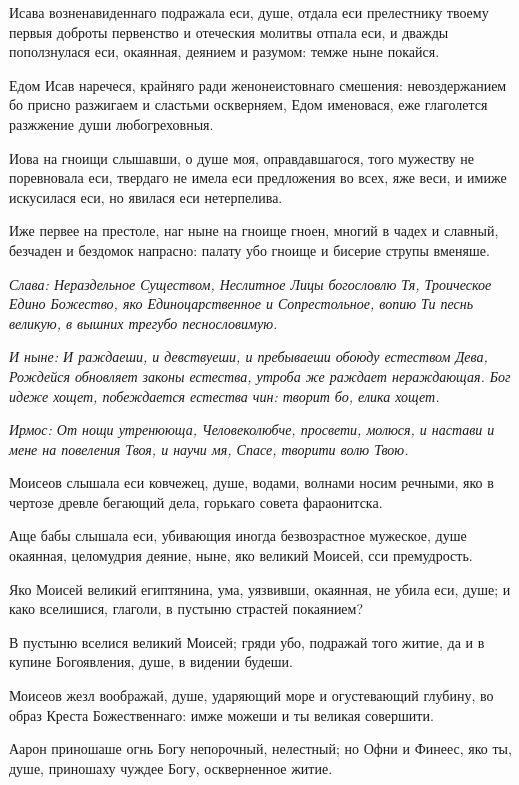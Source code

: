 Исава возненавиденнаго подражала еси, душе, отдала еси прелестнику твоему первыя доброты первенство и отеческия молитвы отпала еси, и дважды поползнулася еси, окаянная, деянием и разумом: темже ныне покайся. 

Едом Исав наречеся, крайняго ради женонеистовнаго смешения: невоздержанием бо присно разжигаем и сластьми оскверняем, Едом именовася, еже глаголется разжжение души любогреховныя. 

Иова на гноищи слышавши, о душе моя, оправдавшагося, того мужеству не поревновала еси, твердаго не имела еси предложения во всех, яже веси, и имиже искусилася еси, но явилася еси нетерпелива. 

Иже первее на престоле, наг ныне на гноище гноен, многий в чадех и славный, безчаден и бездомок напрасно: палату убо гноище и бисерие струпы вменяше. 

\itshape Слава\normalfont{}: Нераздельное Существом, Неслитное Лицы богословлю Тя, Троическое Едино Божество, яко Единоцарственное и Сопрестольное, вопию Ти песнь великую, в вышних трегубо песнословимую. 

\itshape И ныне\normalfont{}: И раждаеши, и девствуеши, и пребываеши обоюду естеством Дева, Рождейся обновляет законы естества, утроба же раждает нераждающая. Бог идеже хощет, побеждается естества чин: творит бо, елика хощет. 


\itshape Ирмос\normalfont{}: От нощи утренююща, Человеколюбче, просвети, молюся, и настави и мене на повеления Твоя, и научи мя, Спасе, творити волю Твою. 

Моисеов слышала еси ковчежец, душе, водами, волнами носим речными, яко в чертозе древле бегающий дела, горькаго совета фараонитска. 

Аще бабы слышала еси, убивающия иногда безвозрастное мужеское, душе окаянная, целомудрия деяние, ныне, яко великий Моисей, сси премудрость. 

Яко Моисей великий египтянина, ума, уязвивши, окаянная, не убила еси, душе; и како вселишися, глаголи, в пустыню страстей покаянием? 

В пустыню вселися великий Моисей; гряди убо, подражай того житие, да и в купине Богоявления, душе, в видении будеши. 

Моисеов жезл воображай, душе, ударяющий море и огустевающий глубину, во образ Креста Божественнаго: имже можеши и ты великая совершити. 

Аарон приношаше огнь Богу непорочный, нелестный; но Офни и Финеес, яко ты, душе, приношаху чуждее Богу, оскверненное житие. 

